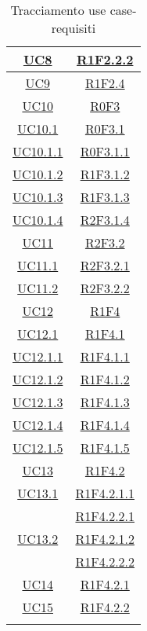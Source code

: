 \begin{longtable}{|c|c|}
	\hline
	\hyperlink{UC8}{UC8} & \hyperlink{R1F2.2.2}{R1F2.2.2}\\
	\hline
	\hyperlink{UC9}{UC9} & \hyperlink{R1F2.4}{R1F2.4}\\
	\hline
	\hyperlink{UC10}{UC10} & \hyperlink{R0F3}{R0F3}\\
	\hline
	\hyperlink{UC10.1}{UC10.1} & \hyperlink{R0F3.1}{R0F3.1}\\
	\hline
	\hyperlink{UC10.1.1}{UC10.1.1} & \hyperlink{R0F3.1.1}{R0F3.1.1}\\
	\hline
	\hyperlink{UC10.1.2}{UC10.1.2} & \hyperlink{R1F3.1.2}{R1F3.1.2}\\
	\hline
	\hyperlink{UC10.1.3}{UC10.1.3} & \hyperlink{R1F3.1.3}{R1F3.1.3}\\
	\hline
	\hyperlink{UC10.1.4}{UC10.1.4} & \hyperlink{R2F3.1.4}{R2F3.1.4}\\
	\hline
	\hyperlink{UC11}{UC11} & \hyperlink{R2F3.2}{R2F3.2}\\
	\hline
	\hyperlink{UC11.1}{UC11.1} & \hyperlink{R2F3.2.1}{R2F3.2.1}\\
	\hline
	\hyperlink{UC11.2}{UC11.2} & \hyperlink{R2F3.2.2}{R2F3.2.2}\\
	\hline
	\hyperlink{UC12}{UC12} & \hyperlink{R1F4}{R1F4}\\
	\hline
	\hyperlink{UC12.1}{UC12.1} & \hyperlink{R1F4.1}{R1F4.1}\\
	\hline
	\hyperlink{UC12.1.1}{UC12.1.1} & \hyperlink{R1F4.1.1}{R1F4.1.1}\\
	\hline
	\hyperlink{UC12.1.2}{UC12.1.2} & \hyperlink{R1F4.1.2}{R1F4.1.2}\\
	\hline
	\hyperlink{UC12.1.3}{UC12.1.3} & \hyperlink{R1F4.1.3}{R1F4.1.3}\\
	\hline
	\hyperlink{UC12.1.4}{UC12.1.4} & \hyperlink{R1F4.1.4}{R1F4.1.4}\\
	\hline
	\hyperlink{UC12.1.5}{UC12.1.5} & \hyperlink{R1F4.1.5}{R1F4.1.5}\\
	\hline
	\hyperlink{UC13}{UC13} & \hyperlink{R1F4.2}{R1F4.2}\\
	\hline
	\hyperlink{UC13.1}{UC13.1} & \hyperlink{R1F4.2.1.1}{R1F4.2.1.1}\\
	& \hyperlink{R1F4.2.2.1}{R1F4.2.2.1}\\
	\hline
	\hyperlink{UC13.2}{UC13.2} & \hyperlink{R1F4.2.1.2}{R1F4.2.1.2}\\
	& \hyperlink{R1F4.2.2.2}{R1F4.2.2.2}\\
	\hline
	\hyperlink{UC14}{UC14} & \hyperlink{R1F4.2.1}{R1F4.2.1}\\
	\hline
	\hyperlink{UC15}{UC15} & \hyperlink{R1F4.2.2}{R1F4.2.2}\\
	\hline
	\caption[Tracciamento use case-requisiti]{Tracciamento use case-requisiti}
	\label{tabella:requi-usecase}
\end{longtable}
\clearpage
